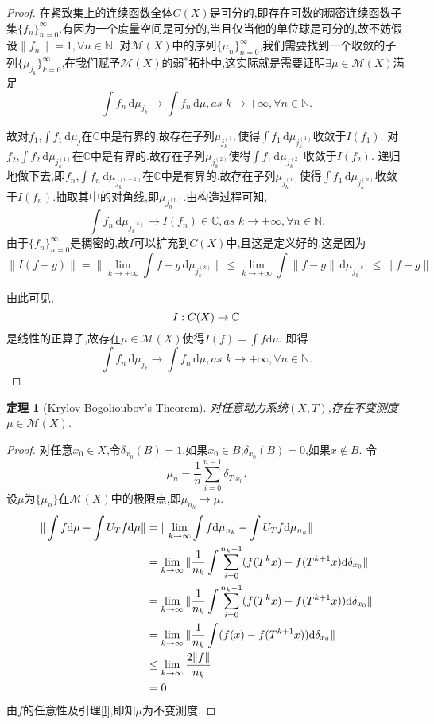 \documentclass[a4paper,11pt,oneside]{book}
\newtheorem{theorem}{\textbf{\hspace{0.7cm}定理}}[section]
\begin{document}
\begin{proof}
在紧致集上的连续函数全体$C(X)$是可分的,即存在可数的稠密连续函数子集$\{f_n\}_{n=0}^{\infty}$.有因为一个度量空间是可分的,当且仅当他的单位球是可分的,故不妨假设$\|f_n\|=1,\forall n\in \mathbb{N}$.
对$\mathcal{M}(X)$中的序列$\{\mu_n\}_{n=0}^{\infty}$,我们需要找到一个收敛的子列$\{\mu_{j_k}\}_{k=0}^{\infty}$,在我们赋予$\mathcal{M}(X)$的弱$^*$拓扑中,这实际就是需要证明$\exists \mu\in \mathcal{M}(X)$满足%
$$\int\! f_n \,\mathrm{d}\mu_{j_k}\rightarrow \int\! f_n \,\mathrm{d}\mu,as\,\, k\rightarrow +\infty,\forall n\in\mathbb{N}.$$

故对$f_1$,$\int\! f_1 \,\mathrm{d}\mu_j$在$\mathbb{C}$中是有界的.故存在子列$\mu_{j_k^{(1)}}$使得$\int\! f_1 \,\mathrm{d}\mu_{j_k^{(1)}}$收敛于$I(f_1)$.
对$f_2$,$\int\! f_2 \,\mathrm{d}\mu_{j_k^{(1)}}$在$\mathbb{C}$中是有界的.故存在子列$\mu_{j_k^{(2)}}$使得$\int\! f_1 \,\mathrm{d}\mu_{j_k^{(2)}}$收敛于$I(f_2)$.
递归地做下去,即$f_n$,$\int\! f_n \,\mathrm{d}\mu_{j_k^{(n-1)}}$在$\mathbb{C}$中是有界的.故存在子列$\mu_{j_k^{(n)}}$使得$\int\! f_1 \,\mathrm{d}\mu_{j_k^{(n)}}$收敛于$I(f_n)$.抽取其中的对角线,即$\mu_{j_n^{(n)}}$.由构造过程可知,%
$$\int\! f_n \,\mathrm{d}\mu_{j_k^{(k)}}\rightarrow I(f_n)\in\mathbb{C},as\,\, k\rightarrow +\infty,\forall n\in\mathbb{N}.$$
由于$\{f_n\}_{n=0}^{\infty}$是稠密的,故$I$可以扩充到$C(X)$中,且这是定义好的,这是因为$$\|I(f-g)\|=\|\lim_{k\to +\infty}\int\! f-g \,\mathrm{d}\mu_{j_k^{(k)}}\|\leq \lim_{k\to +\infty}\int\! \|f-g\| \,\mathrm{d}\mu_{j_k^{(k)}}\leq\|f-g\|$$

由此可见,
$$
I:C(X)\rightarrow \mathbb{C}\\
$$
是线性的正算子,故存在$\mu\in \mathcal{M}(X)$使得$I(f)=\int f \mathrm{d}\mu$.
即得$$\int\! f_n \,\mathrm{d}\mu_{j_k}\rightarrow \int\! f_n \,\mathrm{d}\mu,as\,\, k\rightarrow +\infty,\forall n\in\mathbb{N}.$$
\end{proof}

\begin{theorem}[Krylov-Bogolioubov's Theorem]
对任意动力系统$(X,T)$,存在不变测度$\mu\in\mathcal{M}(X)$.
\end{theorem}
\begin{proof}
对任意$x_0\in X$,令$\delta_{x_0}(B)=1$,如果$x_0\in B$;$\delta_{x_0}(B)=0$,如果$x\notin B$.
令$$\mu_n=\frac{1}{n}\sum_{i=0}^{n-1}\delta_{T^ix_0}.$$
设$\mu$为$\{\mu_n\}$在$\mathcal{M}(X)$中的极限点,即$\mu_{n_k}\rightarrow \mu$.
\begin{align*}
\|\int f \mathrm{d}\mu -\int U_Tf\mathrm{d}\mu\|&=\|\lim_{k\to\infty}\int f \mathrm{d}\mu_{n_k} -\int U_Tf\mathrm{d}\mu_{n_k}\|\\
&=\lim_{k\to\infty}\|\frac{1}{n_k}\int\sum_{i=0}^{n_k-1}(f(T^kx)-f(T^{k+1}x)\mathrm{d}\delta_{x_0}\|\\
&=\lim_{k\to\infty}\|\frac{1}{n_k}\int\sum_{i=0}^{n_k-1}(f(T^kx)-f(T^{k+1}x))\mathrm{d}\delta_{x_0} \|\\
&=\lim_{k\to\infty}\|\frac{1}{n_k}\int(f(x)-f(T^{k+1}x))\mathrm{d}\delta_{x_0} \|\\
&\leq \lim_{k\to\infty}{2\|f\|\over n_k}\\
&=0
\end{align*}
由$f$的任意性及引理\ref{l},即知$\mu$为不变测度.
\end{proof}
\end{document}
